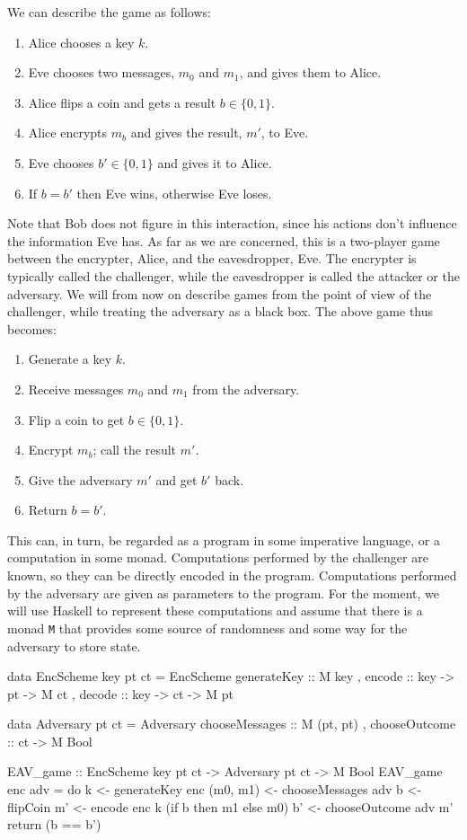 We can describe the game as follows:
\begin{enumerate}
    \itemsep0em
    \item Alice chooses a key $k$.
    \item Eve chooses two messages, $m_0$ and $m_1$, and gives them to Alice.
    \item Alice flips a coin and gets a result $b \in \{0, 1\}$.
    \item Alice encrypts $m_b$ and gives the result, $m'$, to Eve.
    \item Eve chooses $b' \in \{0, 1\}$ and gives it to Alice.
    \item If $b = b'$ then Eve wins, otherwise Eve loses.
\end{enumerate}

Note that Bob does not figure in this interaction, since his actions don't influence the information Eve has.  As far as
we are concerned, this is a two-player game between the encrypter, Alice, and the eavesdropper, Eve.  The encrypter is
typically called the challenger, while the eavesdropper is called the attacker or the adversary.  We will from now on
describe games from the point of view of the challenger, while treating the adversary as a black box.  The above game
thus becomes:
\begin{enumerate}
    \itemsep0em
    \item Generate a key $k$.
    \item Receive messages $m_0$ and $m_1$ from the adversary.
    \item Flip a coin to get $b \in \{0, 1\}$.
    \item Encrypt $m_b$; call the result $m'$.
    \item Give the adversary $m'$ and get $b'$ back.
    \item Return $b = b'$.
\end{enumerate}

This can, in turn, be regarded as a program in some imperative language, or a computation in some monad.  Computations
performed by the challenger are known, so they can be directly encoded in the program.  Computations performed by the
adversary are given as parameters to the program.  For the moment, we will use Haskell to represent these computations
and assume that there is a monad \texttt{M} that provides some source of randomness and some way for the adversary to
store state.
\begin{code}
data EncScheme key pt ct = EncScheme
                           { generateKey :: M key
                           , encode :: key -> pt -> M ct
                           , decode :: key -> ct -> M pt
                           }

data Adversary pt ct = Adversary
                       { chooseMessages :: M (pt, pt)
                       , chooseOutcome :: ct -> M Bool
                       }

EAV_game :: EncScheme key pt ct -> Adversary pt ct -> M Bool
EAV_game enc adv = do
    k <- generateKey enc
    (m0, m1) <- chooseMessages adv
    b <- flipCoin
    m' <- encode enc k (if b then m1 else m0)
    b' <- chooseOutcome adv m'
    return (b == b')
\end{code}



